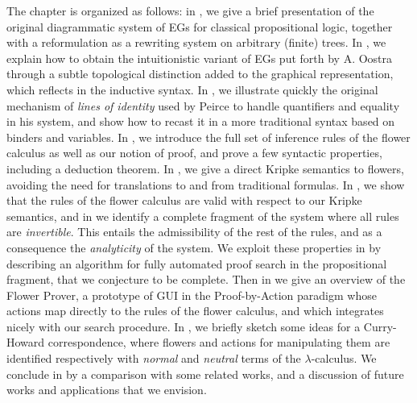 The chapter is organized as follows: in , we give a brief
presentation of the original diagrammatic system  of EGs for
classical propositional logic, together with a reformulation as a rewriting
system on arbitrary (finite) trees. In , we explain how to
obtain the intuitionistic variant of EGs put forth by A. Oostra
\cite{oostra_graficos_2010} through a subtle topological distinction added to
the graphical representation, which reflects in the inductive syntax. In
, we illustrate quickly the original mechanism of
\emph{lines of identity} used by Peirce to handle quantifiers and equality in
his  system, and show how to recast it in a more traditional syntax
based on binders and variables. In , we introduce the full set
of inference rules of the flower calculus as well as our notion of proof, and
prove a few syntactic properties, including a deduction theorem. In
, we give a direct Kripke semantics to flowers, avoiding the
need for translations to and from traditional formulas. In ,
we show that the rules of the flower calculus are valid with respect to our
Kripke semantics, and in  we identify a complete fragment
of the system where all rules are \emph{invertible}. This entails the
admissibility of the rest of the rules, and as a consequence the
\emph{analyticity} of the system. We exploit these properties in
 by describing an algorithm for fully automated proof
search in the propositional fragment, that we conjecture to be complete. Then in
 we give an overview of the Flower Prover, a prototype of
GUI in the Proof-by-Action paradigm whose actions map directly to the rules of
the flower calculus, and which integrates nicely with our search procedure. In
, we briefly sketch some ideas for a Curry-Howard
correspondence, where flowers and actions for manipulating them are identified
respectively with \emph{normal} and \emph{neutral} terms of the
$\lambda$-calculus. We conclude in  by a comparison with some
related works, and a discussion of future works and applications that we
envision.


